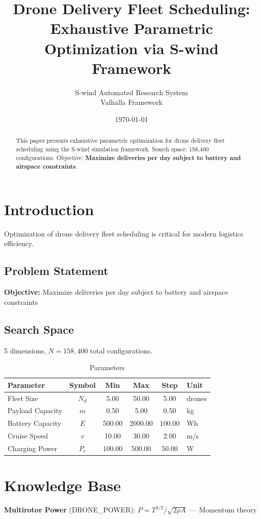 \documentclass[11pt,twocolumn]{article}
\title{Drone Delivery Fleet Scheduling: \\Exhaustive Parametric Optimization via S-wind Framework}
\author{S-wind Automated Research System\\Valhalla Framework}
\date{\today}
\begin{document}
\maketitle

\begin{abstract}
This paper presents exhaustive parametric optimization for drone delivery fleet scheduling using the S-wind simulation framework.
Search space: 158,400 configurations. Objective: \textbf{Maximize deliveries per day subject to battery and airspace constraints}.
\end{abstract}

\section{Introduction}
Optimization of drone delivery fleet scheduling is critical for modern logistics efficiency.

\subsection{Problem Statement}
\textbf{Objective:} Maximize deliveries per day subject to battery and airspace constraints

\subsection{Search Space}
5 dimensions, $N = 158,400$ total configurations.

\begin{table}[h]
\centering
\caption{Parameters}
\begin{tabular}{@{}lccccl@{}}
\toprule
Parameter & Symbol & Min & Max & Step & Unit \\
\midrule
Fleet Size & $N_d$ & 5.00 & 50.00 & 5.00 & drones \\
Payload Capacity & $m$ & 0.50 & 5.00 & 0.50 & kg \\
Battery Capacity & $E$ & 500.00 & 2000.00 & 100.00 & Wh \\
Cruise Speed & $v$ & 10.00 & 30.00 & 2.00 & m/s \\
Charging Power & $P_c$ & 100.00 & 500.00 & 50.00 & W \\
\bottomrule
\end{tabular}
\end{table}

\section{Knowledge Base}
\textbf{Multirotor Power} (DRONE_POWER): $P = T^{3/2}/\sqrt{2\rho A}$ --- Momentum theory
\end{document}
